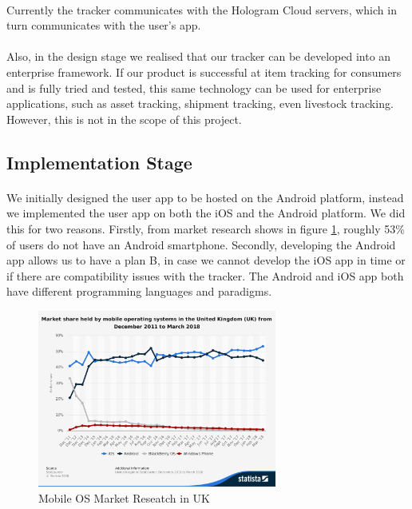 \documentclass[12pt,a4paper]{article}
\begin{document}
        \paragraph{} Currently the tracker communicates with the Hologram Cloud servers, which in turn communicates with the user’s app.
        
        \paragraph{} Also, in the design stage we realised that our tracker can be developed into an enterprise framework. If our product is successful at item tracking for consumers and is fully tried and tested, this same technology can be used for enterprise applications, such as asset tracking, shipment tracking, even livestock tracking. However, this is not in the scope of this project.
        
      \subsection{Implementation Stage}

        \paragraph{} We initially designed the user app to be hosted on the Android platform, instead we implemented the user app on both the iOS and the Android platform. We did this for two reasons. Firstly, from market research shows in figure \ref{fig:Mobile OS Market Reseatch in UK}, roughly 53\% of users do not have an Android smartphone. Secondly, developing the Android app allows us to have a plan B, in case we cannot develop the iOS app in time or if there are compatibility issues with the tracker. The Android and iOS app both have different programming languages and paradigms. 

        \begin{figure}[H]
          \centering
          \includegraphics[width=0.7\textwidth]{../assets/design-implement-stage-market-research.png}
          \caption{Mobile OS Market Reseatch in UK \cite{MobileOSMarketShare}}
          \label{fig:Mobile OS Market Reseatch in UK}
        \end{figure}
        
\end{document}

